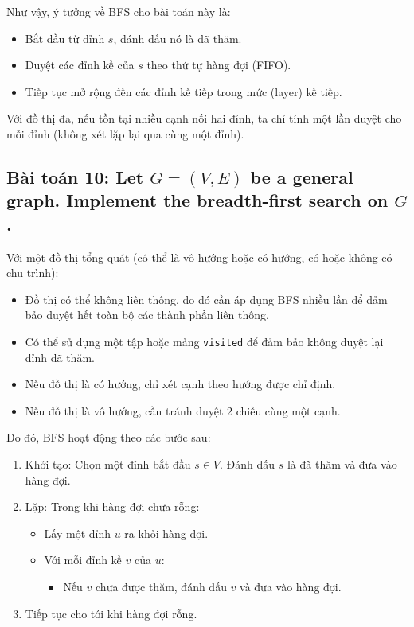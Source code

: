 \documentclass{article}
\begin{document}
	Như vậy, ý tưởng về BFS cho bài toán này là:
	
		\begin{itemize}
			\item Bắt đầu từ đỉnh $s$, đánh dấu nó là đã thăm.
			\item Duyệt các đỉnh kề của $s$ theo thứ tự hàng đợi (FIFO).
			\item Tiếp tục mở rộng đến các đỉnh kế tiếp trong mức (layer) kế tiếp.
		\end{itemize}
	Với đồ thị đa, nếu tồn tại nhiều cạnh nối hai đỉnh, ta chỉ tính một lần duyệt cho mỗi đỉnh (không xét lặp lại qua cùng một đỉnh).
	
	\subsection*{Bài toán 10: Let $G = (V,E)$ be a general graph. Implement the breadth-first search on $G$.}
	
	Với một đồ thị tổng quát (có thể là vô hướng hoặc có hướng, có hoặc không có chu trình):
	
	\begin{itemize}
		\item Đồ thị có thể không liên thông, do đó cần áp dụng BFS nhiều lần để đảm bảo duyệt hết toàn bộ các thành phần liên thông.
		\item Có thể sử dụng một tập hoặc mảng \texttt{visited} để đảm bảo không duyệt lại đỉnh đã thăm.
		\item Nếu đồ thị là có hướng, chỉ xét cạnh theo hướng được chỉ định.
		\item Nếu đồ thị là vô hướng, cần tránh duyệt 2 chiều cùng một cạnh.
	\end{itemize}
	
	Do đó, BFS hoạt động theo các bước sau:
	
	\begin{enumerate}
		\item Khởi tạo: Chọn một đỉnh bắt đầu $s \in V$. Đánh dấu $s$ là đã thăm và đưa vào hàng đợi.
		
		\item Lặp: Trong khi hàng đợi chưa rỗng:
		\begin{itemize}
			\item Lấy một đỉnh $u$ ra khỏi hàng đợi.
			\item Với mỗi đỉnh kề $v$ của $u$:
			\begin{itemize}
				\item Nếu $v$ chưa được thăm, đánh dấu $v$ và đưa vào hàng đợi.
			\end{itemize}
		\end{itemize}
		
		\item Tiếp tục cho tới khi hàng đợi rỗng.
	\end{enumerate}
	
\end{document}
